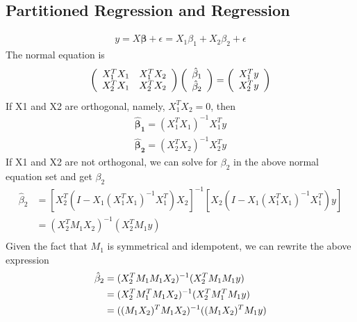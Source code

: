 \documentclass[a4paper]{article}
\begin{document}
\subsection{Partitioned Regression and  Regression}
\begin{align*}
y = X \boldsymbol \beta + \epsilon = X_1 \beta_1 + X_2 \beta_2 + \epsilon
\end{align*}
The normal equation is
\begin{align*}
 \left( \begin{array} { c  c } 
                   X_1^TX_1 & X_1^TX_2  \\
                   X_2^TX_1 & X_2^TX_2   \\
           \end{array} \right)
 \left( \begin{array} { c  } 
                   \hat \beta_1   \\
                   \hat \beta_2   \\
           \end{array} \right) =
\left( \begin{array} { c  } 
                   X_1^T y   \\
                   X_2^T y   \\
           \end{array} \right)
\end{align*}
If X1 and X2 are orthogonal, namely, $X_1^T X_2=0$, then 
\begin{align*}
\boldsymbol {\hat  \beta_1} = (X_1^T X_1)^{-1} X_1^Ty\\
\boldsymbol {\hat  \beta_2} = (X_2^T X_2)^{-1} X_2^Ty
\end{align*}
If X1 and X2 are not orthogonal, we can solve for $\beta_2$ in the above normal equation set and get $\beta_2$
\begin{align*}
\hat \beta_2 & = [X_2^T(I-X_1(X_1^TX_1)^{-1}X_1^T)X_2]^{-1}[X_2(I-X_1(X_1^TX_1)^{-1}X_1^T)y]\\
& = (X_2^T M_1X_2)^{-1}(X_2^T  M_1y) \\
\end{align*}
Given the fact that $M_1$ is symmetrical and idempotent, we can rewrite the above expression
\begin{align}
\hat \beta_2  & = (X_2^T M_1 M_1X_2)^{-1}(X_2^T M_1 M_1y)  \notag \\
&= (X_2^T M_1^T M_1X_2)^{-1}(X_2^TM_1^T M_1y) \notag \\
& = ((M_1 X_2)^T  M_1X_2)^{-1}((M_1 X_2)^T M_1y)  \label{eq:partial} 
\end{align}
\end{document}
